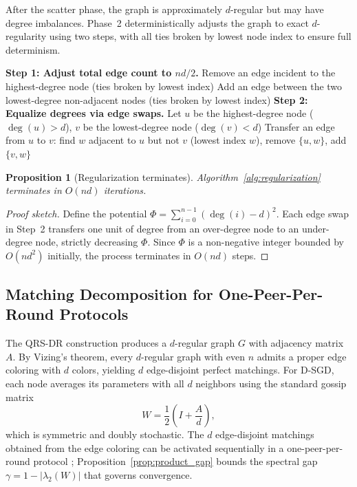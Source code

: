 \documentclass{article}
\newtheorem{proposition}[theorem]{Proposition}
\begin{document}
After the scatter phase, the graph is approximately $d$-regular but may
have degree imbalances.  Phase~2 deterministically adjusts the graph to
exact $d$-regularity using two steps, with all ties broken by lowest
node index to ensure full determinism.

\begin{algorithm}[h]
\caption{Degree Regularization}
\label{alg:regularization}
\begin{algorithmic}[1]
\STATE \textbf{Step 1: Adjust total edge count to $nd/2$.}
    \STATE Remove an edge incident to the highest-degree node
           (ties broken by lowest index)
\ENDWHILE
{}
    \STATE Add an edge between the two lowest-degree non-adjacent nodes
           (ties broken by lowest index)
\ENDWHILE
\STATE \textbf{Step 2: Equalize degrees via edge swaps.}
    \STATE Let $u$ be the highest-degree node ($\deg(u) > d$),
           $v$ be the lowest-degree node ($\deg(v) < d$)
    \STATE Transfer an edge from $u$ to $v$: find $w$ adjacent to $u$
           but not $v$ (lowest index $w$), remove $\{u,w\}$, add $\{v,w\}$
\ENDWHILE
\end{algorithmic}
\end{algorithm}

\begin{proposition}[Regularization terminates]
\label{prop:regularization}
Algorithm~\ref{alg:regularization} terminates in $O(nd)$ iterations.
\end{proposition}
\begin{proof}[Proof sketch]
Define the potential $\Phi = \sum_{i=0}^{n-1}(\deg(i) - d)^2$.
Each edge swap in Step~2 transfers one unit of degree from an
over-degree node to an under-degree node, strictly decreasing $\Phi$.
Since $\Phi$ is a non-negative integer bounded by $O(n d^2)$ initially,
the process terminates in $O(nd)$ steps.
\end{proof}


\subsection{Matching Decomposition for One-Peer-Per-Round Protocols}
\label{sec:matching}

The QRS-DR construction produces a $d$-regular graph $G$ with
adjacency matrix $A$.  By Vizing's theorem, every $d$-regular graph
with even $n$ admits a proper edge coloring with $d$ colors, yielding
$d$ edge-disjoint perfect matchings.  For D-SGD, each node averages
its parameters with all $d$ neighbors using the standard gossip matrix
\begin{equation}
\label{eq:mixing}
W = \frac{1}{2}\!\left(I + \frac{A}{d}\right),
\end{equation}
which is symmetric and doubly stochastic.  The $d$
edge-disjoint matchings obtained from the edge coloring can be activated
sequentially in a one-peer-per-round protocol
\cite{jin2022equitopo}; Proposition~\ref{prop:product_gap} bounds
the spectral gap $\gamma = 1 - |\lambda_2(W)|$ that governs
convergence.
\end{document}
